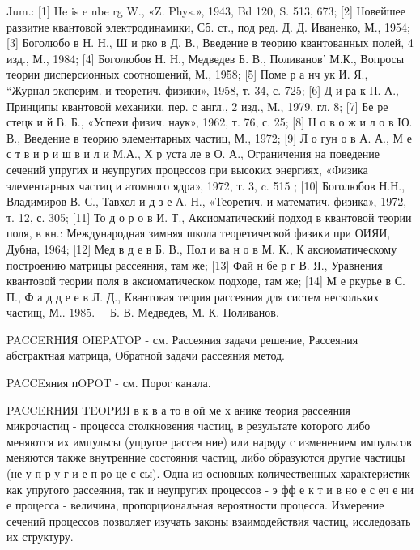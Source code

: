 \documentclass[10pt]{article}
\begin{document}
Jum.: [1] He is e nbe rg W., «Z. Phys.», 1943, Bd 120, S. 513, 673; [2] Новейшее развитие квантовой электродинамики, Сб. ст., под ред. Д. Д. Иваненко, М., 1954; [3] Боголюбо в Н. Н., Ш и рко в Д. В., Введение в теорию квантованных полей, 4 изд., М., 1984; [4] Боголюбов Н. Н., Медведев Б. В., Поливанов' М.К., Вопросы теории дисперсионных соотношений, М., 1958; [5] Поме р а нч ук И. Я., “Журнал эксперим. и теоретич. физики», 1958, т. 34, с. 725; [6] Д и ра к П. А., Принципы квантовой механики, пер. с англ., 2 изд., М., 1979, гл. 8; [7] Бе ре стецк и й В. Б., «Успехи физич. наук», 1962, т. 76, с. 25; [8] Н о в о ж и л о в Ю. В., Введение в теорию элементарных частиц, М., 1972; [9] Л о гун о в А. А., М е с т в и р и ш в и л и М.А., Х р уста ле в О. А., Ограничения на поведение сечений упругих и неупругих процессов при высоких энергиях, «Физика элементарных частиц и атомного ядра», 1972, т. 3, c. 515 ; [10] Боголюбов Н.Н., Владимиров В. С., Тавхел и д з е А. Н., «Теоретич. и математич. физика», 1972, т. 12, с. 305; [11] То д о р о в И. Т., Аксиоматический подход в квантовой теории поля, в кн.: Международная зимняя школа теоретической физики при ОИЯИ, Дубна, 1964; [12] Мед в д е в Б. В., Пол и ва н о в М. К., К аксиоматическому построению матрицы рассеяния, там же; [13] Фай н бе р г В. Я., Уравнения квантовой теории поля в аксиоматическом подходе, там же; [14] М е ркурье в С. П., Ф а д д е е в Л. Д., Квантовая теория рассеяния для систем нескольких частищ, М.. $1985 . \quad$ Б. В. Медведев, М. К. Поливанов.



PACCERHИЯ OIEPATOP - см. Рассеяния задачи решение, Рассеяния абстрактная матрица, Обратной задачи рассеяния метод.



PACCEяния пOPOT - см. Порог канала.



PACCERHИЯ TEOPИЯ в к в а то в ой ме х анике теория рассеяния микрочастиц - процесса столкновения частиц, в результате которого либо меняются их импульсы (упругое рассея ние) или наряду с изменением импульсов меняются также внутренние состояния частиц, либо образуются другие частицы (не у п р у г и е п ро це с сы). Одна из основных количественных характеристик как упругого рассеяния, так и неупругих процессов - э фф е к т и в но е с еч е ни е процесса - величина, пропорциональная вероятности процесса. Измерение сечений процессов позволяет изучать законы взаимодействия частиц, исследовать их структуру.
\end{document}
